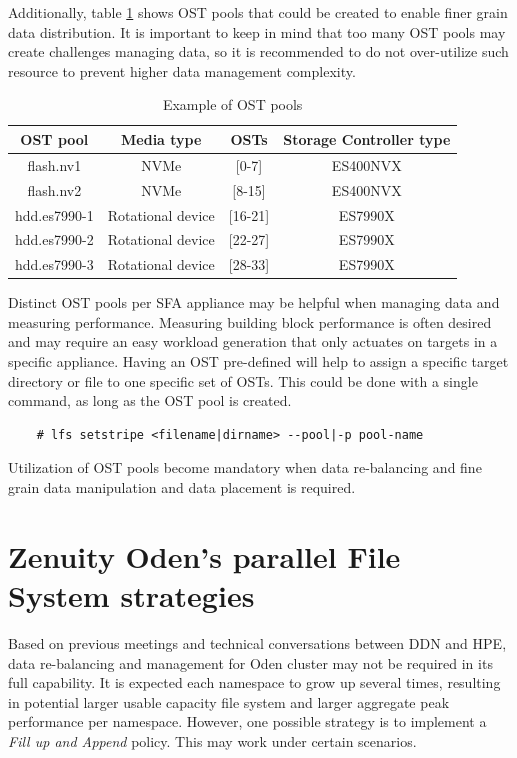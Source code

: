 \documentclass{article}
\begin{document}
Additionally, table \ref{tab:example-ost-pools} shows OST pools that could be created to enable finer grain data distribution. It is important to keep in mind that too many OST pools may create challenges managing data, so it is recommended to do not over-utilize such resource to prevent higher data management complexity.

\begin{table}[h]
\centering
 \begin{tabular}{||c c c c||} 
 \hline
 OST pool & Media type & OSTs & Storage Controller type \\ [0.5ex] 
 \hline\hline
 flash.nv1 & NVMe & [0-7] & ES400NVX \\ 
 \hline
  flash.nv2 & NVMe & [8-15] & ES400NVX \\ 
 \hline
 hdd.es7990-1 & Rotational device & [16-21] & ES7990X\\
 \hline
  hdd.es7990-2 & Rotational device & [22-27] & ES7990X\\
 \hline
  hdd.es7990-3 & Rotational device & [28-33] & ES7990X\\
 \hline
 \end{tabular}
 \caption{Example of OST pools}
 \label{tab:example-ost-pools}
\end{table}

Distinct OST pools per SFA appliance may be helpful when managing data and measuring performance. Measuring
building block performance is often desired and may require an easy workload generation that only actuates on targets in a specific appliance. Having an OST pre-defined will help to assign a specific target directory or file to one specific set of OSTs. This could be done with a single command, as long as the OST pool is created.

    \begin{verbatim}
    # lfs setstripe <filename|dirname> --pool|-p pool-name
    \end{verbatim}
Utilization of OST pools become mandatory when data re-balancing and fine grain data manipulation and  data placement is required. 

\section{Zenuity Oden's parallel File System strategies}
Based on previous meetings and technical conversations between DDN and HPE, data re-balancing and management for Oden cluster may not be required in its full capability. It is expected each namespace to grow up several times, resulting in potential larger usable capacity file system and larger aggregate peak performance per namespace. However, one possible strategy is to implement a \textit{Fill up and Append} policy. This may work under certain scenarios. 
\end{document}
